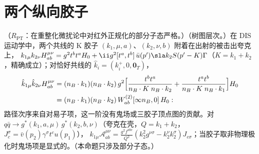 \section{两个纵向胶子}\label{sec:appF-two}

\begin{proposition}\label{prop:appF-two-gluon}
（$R_{\mathrm{PT}}$：在重整化微扰论中对红外正规化的部分子态严格。）（树图层次。）在 DIS 运动学中，两个共线的 K 胶子 $(k_1,\mu,a)$、$(k_2,\nu,b)$ 附着在出射的被击出夸克上，
$k_{1\mu}k_{2\nu}H^{\mu\nu}_{ab}=g^2t^bt^aH_0+\ii g^2[t^a,t^b]\,\bar u(p')\sla k_2S(p'-K)\Gamma$（$K=k_1+k_2$，精确成立）；对恰好共线的 $\hat k_i=(k_i^+,0,\mathbf 0_T)$，
\begin{equation}\label{eq:appF-two}
\begin{aligned}
\hat k_{1\mu}\hat k_{2\nu}H^{\mu\nu}_{ab}&=(n_B\cdot k_1)(n_B\cdot k_2)\,g^2\Bigl[\frac{t^bt^a}{n_B\cdot K\;n_B\cdot k_2}+\frac{t^at^b}{n_B\cdot K\;n_B\cdot k_1}\Bigr]H_0\\
&=(n_B\cdot k_1)(n_B\cdot k_2)\,W^{(2)}_{ab}[\infty n_B,0]\,H_0 :
\end{aligned}
\end{equation}
路径次序来自对易子项，这一阶没有鬼场或三胶子顶点图的贡献。对 $q\bar q\to g^*(k_1,a,\mu)\,g^*(k_2,b,\nu)$（夸克在壳，$Q=k_1+k_2$，$J_c^\sigma=\bar v(p_2)\gamma^\sigma t^cu(p_1)$），
$k_{1\mu}\mathcal A^{\mu\nu}_{ab}=\frac{g^2f^{abc}}{Q^2}(k_2^2g^{\nu\sigma}-k_2^\nu k_2^\sigma)J_{c\sigma}$；当胶子取非物理极化时鬼场项是显式的。（本命题只涉及部分子态。）
\end{proposition}


